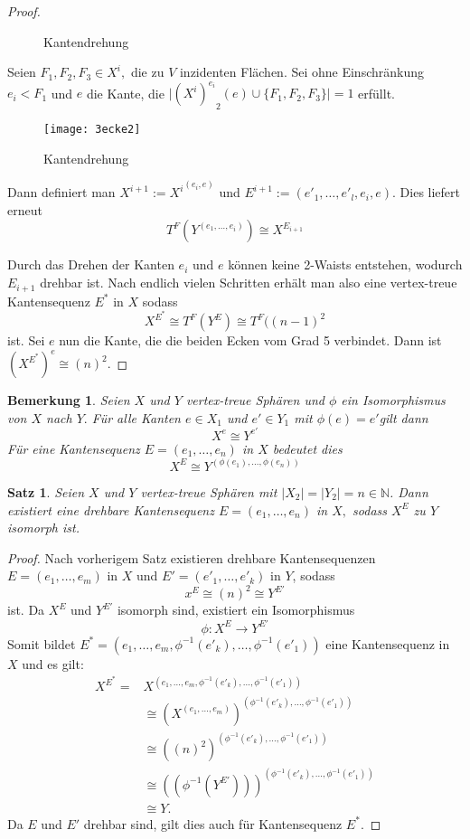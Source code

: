 \documentclass[12pt,titlepage,twoside,cleardoublepage]{article}
\theoremstyle{nummermitklammern}
\newtheorem{bemerkung}[temp]{Bemerkung}
\newtheorem{satz}[temp]{Satz}
\newtheorem{bemerkung}[zahl]{Bemerkung}
\newtheorem{satz}[zahl]{Satz}
\numberwithin{equation}{section}
\begin{document}
\begin{proof}
\begin{itemize}
\begin{figure}[H]
\caption{Kantendrehung}
\end{figure}
Seien $F_1,F_2,F_3\in X^i,$ die zu $V$ inzidenten Flächen. Sei ohne Einschränkung $e_i<F_1$ und $e$ die Kante, die $\vert {(X^i)^{e_i}}_2(e)\cup \{F_1,F_2,F_3\}\vert =1$ erfüllt.
\begin{figure}[H]
\begin{center}
\texttt{[image: 3ecke2]}
\end{center}
\caption{Kantendrehung}
\end{figure}
Dann definiert man $X^{i+1}:={X^i}^{(e_i,e)}$ und $E^{i+1}:=(e'_1,\ldots,e'_l,e_i,e).$ Dies liefert erneut
\[
T^F(Y^{(e_1,\ldots,e_i)})\cong X^{E_{i+1}}
\] 
\end{itemize}
 Durch das Drehen der Kanten $e_i$ und $e$ können keine 2-Waists entstehen, wodurch $E_{i+1}$ drehbar ist.
Nach endlich vielen Schritten erhält man also eine vertex-treue Kantensequenz $E^*$ in $X$ sodass 
\[X^{E^*}\cong T^F(Y^E) \cong T^F((n-1)^2
\]ist.
Sei $e$ nun die Kante, die die beiden Ecken vom Grad 5 verbindet. Dann ist $(X^{E^*})^e\cong (n)^2.$
\end{proof}
\begin{bemerkung}
Seien $X$ und $Y$ vertex-treue Sphären und $\phi$ ein Isomorphismus von $X$ nach $Y.$ Für alle Kanten $e\in X_1$ und $e'\in Y_1$ mit $\phi(e)=e'$gilt dann
\[ 
X^e \cong Y^{e'} 
\]
Für eine Kantensequenz $E=(e_1,\ldots,e_n)$ in $X$ bedeutet dies 
\[
X^E\cong Y^{(\phi(e_1),\ldots,\phi(e_n))}
\]
\end{bemerkung}
\begin{satz} \label{kantendrehung}
Seien $X$ und $Y$ vertex-treue Sphären mit $\vert X_2\vert=\vert Y_2\vert=n\in \mathbb{N}$.
Dann existiert eine drehbare Kantensequenz $E=(e_1,\ldots,e_n)$ in $X,$ sodass  $X^E$ zu $Y$ isomorph ist. 
\end{satz}
\begin{proof}
Nach vorherigem Satz existieren drehbare Kantensequenzen $E=(e_1,\ldots,e_m)$ in $X$ und $E'=(e'_1,\ldots,e'_{k})$ in $Y$, sodass 
\[
x^E\cong (n)^2 \cong Y^{E'}
\] ist.
Da $X^E$ und $Y^{E'}$ isomorph sind, existiert ein Isomorphismus 
\[
\phi: X^E\to Y^{E'}
\]
Somit bildet $E^*=(e_1,\ldots,e_m,\phi^{-1}(e'_{k}),\ldots,\phi^{-1}(e'_{1}))$ eine Kantensequenz in $X$ und es gilt:
\begin{align*}
X^{E^{*}} = &X^{(e_1,\ldots,e_m,\phi^{-1}(e'_{k}),\ldots,\phi^{-1}(e'_{1}))}\\
&\cong (X^{(e_1,\ldots,e_m)})^{(\phi^{-1}(e'_{k}),\ldots,\phi^{-1}(e'_{1}))}\\
&\cong ((n)^2)^{(\phi^{-1}(e'_{k}),\ldots,\phi^{-1}(e'_{1}))}\\
&\cong ((\phi^{-1}(Y^{E'})))^{(\phi^{-1}(e'_{k}),\ldots,\phi^{-1}(e'_{1}))}\\
&\cong Y .
\end{align*}
Da $E$ und $E'$ drehbar sind, gilt dies auch für Kantensequenz $E^*.$
\end{proof}
\end{document}
